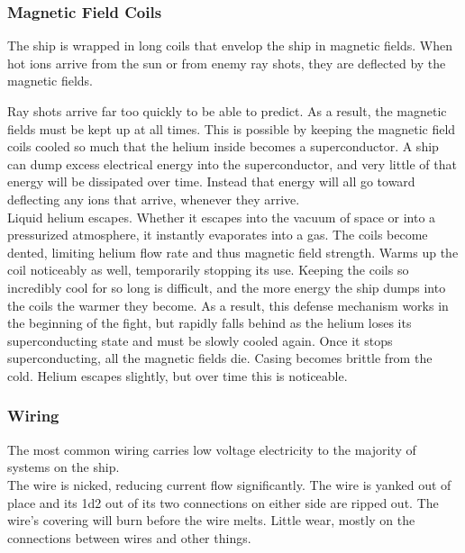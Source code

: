 \documentclass[a4paper]{article}
\begin{document}
\vspace{-0.5cm} \hspace{-18pt} \subsubsection{Magnetic Field Coils} \label{grid_m_field_coils} \vspace{-0.2cm}
The ship is wrapped in long coils that envelop the ship in magnetic fields. When hot ions arrive from the sun or from enemy ray shots, they are deflected by the magnetic fields. 

Ray shots arrive far too quickly to be able to predict. As a result, the magnetic fields must be kept up at all times. This is possible by keeping the magnetic field coils cooled so much that the helium inside becomes a superconductor. A ship can dump excess electrical energy into the superconductor, and very little of that energy will be dissipated over time. Instead that energy will all go toward deflecting any ions that arrive, whenever they arrive.
\\ \pbhw
{Liquid helium escapes. Whether it escapes into the vacuum of space or into a pressurized atmosphere, it instantly evaporates into a gas. }
{The coils become dented, limiting helium flow rate and thus magnetic field strength. Warms up the coil noticeably as well, temporarily stopping its use.}
{Keeping the coils so incredibly cool for so long is difficult, and the more energy the ship dumps into the coils the warmer they become. As a result, this defense mechanism works in the beginning of the fight, but rapidly falls behind as the helium loses its superconducting state and must be slowly cooled again. Once it stops superconducting, all the magnetic fields die.}
{Casing becomes brittle from the cold. Helium escapes slightly, but over time this is noticeable.}


\vspace{-0.5cm} \hspace{-18pt} \subsubsection{Wiring} \label{grid_wiring} \vspace{-0.2cm}
The most common wiring carries low voltage electricity to the majority of systems on the ship.
\\ \pbhw
{The wire is nicked, reducing current flow significantly.}
{The wire is yanked out of place and its 1d2 out of its two connections on either side are ripped out.}
{The wire's covering will burn before the wire melts.}
{Little wear, mostly on the connections between wires and other things.}
\end{document}
